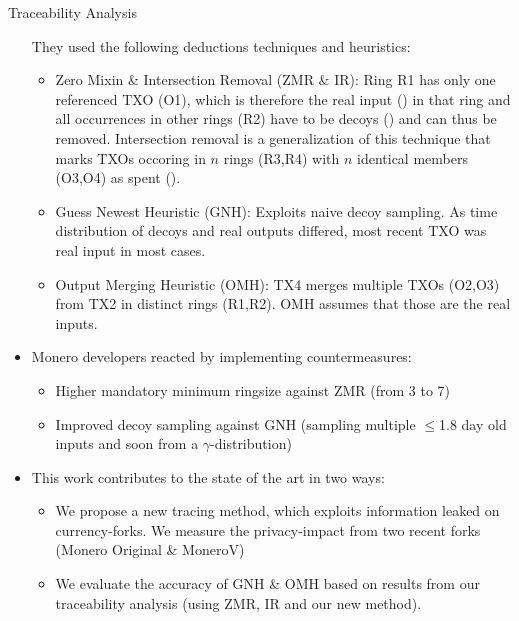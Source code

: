 \begin{columns}[t]
\begin{column}{.47\textwidth}
\begin{block}{Traceability Analysis}
\begin{itemize}
    They used the following deductions techniques and heuristics:%
    \begin{itemize}
        \item Zero Mixin \& Intersection Removal (ZMR \& IR): Ring R1 has only one referenced TXO (O1), which is therefore the real input () in that ring and all occurrences in other rings (R2) have to be decoys () and can thus be removed.
        Intersection removal is a generalization of this technique that marks TXOs occoring in $n$ rings (R3,R4)  with $n$ identical members (O3,O4) as spent ().
        \vspace*{0.5cm}
        \begin{center}
            
        \end{center}
        \item Guess Newest Heuristic (GNH): Exploits naive decoy sampling. As time distribution of decoys and real outputs differed, most recent TXO was real input in most cases.
        \item Output Merging Heuristic (OMH): TX4 merges multiple TXOs (O2,O3) from TX2 in distinct rings (R1,R2). OMH assumes that those are the real inputs.
        \vspace*{0.5cm}
        \begin{center}
            
        \end{center}
    \end{itemize}
    \item Monero developers reacted by implementing countermeasures:
    \begin{itemize}
        \item Higher mandatory minimum ringsize against ZMR (from 3 to 7)
        \item Improved decoy sampling against GNH (sampling multiple $\leq$1.8 day old inputs and soon from a $\gamma$-distribution)
    \end{itemize}
    \item This work contributes to the state of the art in two ways:
    \begin{itemize}
        \item We propose a new tracing method, which exploits information leaked on currency-forks. We measure the privacy-impact from two recent forks (Monero Original \& MoneroV)
        \item We evaluate the accuracy of GNH \& OMH based on results from our traceability analysis (using ZMR, IR and our new method).

\end{itemize}
\end{itemize}
\end{block}
\end{column}
\end{columns}
